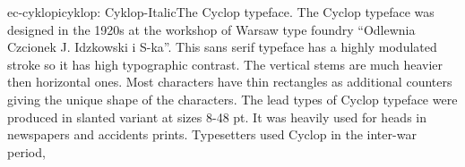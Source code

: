 \documentclass{ddltxtyp}
\begin{document}
\begin{package}{ec-cyklopi}{cyklop: Cyklop-Italic}{The Cyclop typeface.}
The Cyclop typeface was designed in the 1920s at the workshop
of Warsaw type foundry ``Odlewnia Czcionek J. Idzkowski i S-ka''.
This sans serif typeface has a highly modulated stroke so it
has high typographic contrast. The vertical stems are much
heavier then horizontal ones. Most characters have thin
rectangles as additional counters giving the unique shape of
the characters. The lead types of Cyclop typeface were produced
in slanted variant at sizes 8-48 pt. It was heavily used for
heads in newspapers and accidents prints. Typesetters used
Cyclop in the inter-war period, %
\end{package}
\end{document}
